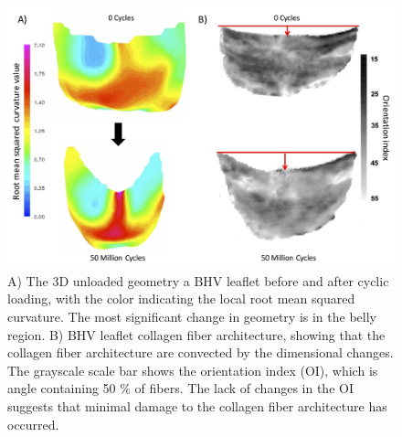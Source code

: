 \begin{figure}[hbt]
\centering
\includegraphics[width=\textwidth]{Images/chapter4/figure1}
\caption{A) The 3D unloaded geometry a BHV leaflet before and after cyclic loading, with the color indicating the local root mean squared curvature. The most significant change in geometry is in the belly region. B) BHV leaflet collagen fiber architecture, showing that the collagen fiber architecture are convected by the dimensional changes. The grayscale scale bar shows the orientation index (OI), which is angle containing 50 \% of fibers. The lack of changes in the OI suggests that minimal damage to the collagen fiber architecture has occurred.}
\label{c1:fig:PSeffects}
\end{figure}



    
